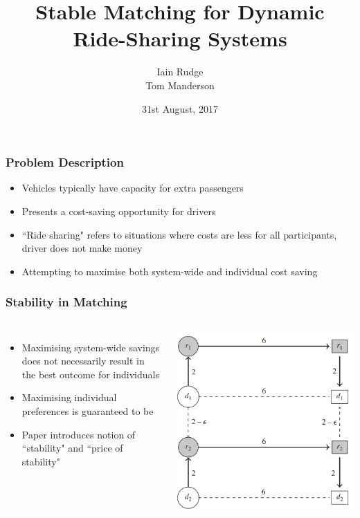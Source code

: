 \documentclass{beamer}
\title[Stable Matching for Dynamic Ride-Sharing ]{Stable Matching for Dynamic Ride-Sharing Systems}
\author[Iain Rudge, Tom Manderson]{Iain Rudge\\Tom Manderson}
\date{31st August, 2017}
\begin{document}
\begin{frame}
	\titlepage
\end{frame}

\begin{frame}
\frametitle{Problem Description}
\begin{itemize}
	\item Vehicles typically have capacity for extra passengers
    \item Presents a cost-saving opportunity for drivers
    \item ``Ride sharing" refers to situations where costs are less for all participants, driver does not make money
    \item Attempting to maximise both system-wide and individual cost saving
\end{itemize}
\end{frame}

\begin{frame}
\frametitle{Stability in Matching}
\begin{columns}
  \begin{itemize}
  \item Maximising system-wide savings does not necessarily result in the best outcome for individuals
  \item Maximising individual preferences is guaranteed to be 
  \item Paper introduces notion of ``stability" and ``price of stability"
  \end{itemize}

  \includegraphics[width=\textwidth]{stability.png}
\end{columns}
\end{frame}
\end{document}
